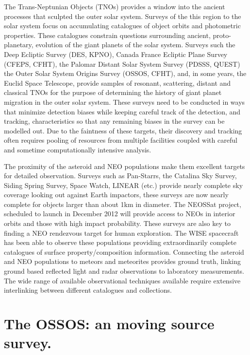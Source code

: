 \documentclass[11pt,twoside]{article}
\begin{document}
The Trans-Neptunian Objects (TNOs) provides a window into the ancient processes that sculpted the outer solar system.  
Surveys of the this region to the solar system focus on accumulating catalogues of object orbits and photometric properties.  
These catalogues constrain questions surrounding ancient, proto-planetary, evolution of the giant planets of the solar system.  
Surveys such the Deep Ecliptic Survey (DES, KPNO),  Canada France Ecliptic Plane Survey (CFEPS, CFHT), the Palomar Distant Solar System Survey (PDSSS, QUEST)  the  Outer Solar System Origins Survey (OSSOS, CFHT),  and, in some years, the Euclid Space Telescope, provide samples of resonant, scattering, distant and classical TNOs for the purpose of determining the history of giant planet migration in the outer solar system.
These surveys need to be conducted in ways that minimize detection biases while keeping careful track of the detection, and tracking, characteristics so that any remaining biases in the survey can be modelled out. 
Due to the faintness of these targets, their discovery and tracking often requires pooling of resources from multiple facilities coupled with careful and sometime computationally intensive analysis.

The proximity of the asteroid and NEO populations make them excellent targets for detailed observation.
Surveys such as Pan-Starrs, the Catalina Sky Survey, Siding Spring Survey, Space Watch, LINEAR (etc.) provide nearly complete sky coverage looking out against Earth impactors, these surveys are now nearly complete for objects larger than about 1km in diameter.  
The NEOSSat project, scheduled to launch in December 2012 will provide access to NEOs in interior orbits and those with high impact probability.  
These surveys are also key to finding a NEO rendezvous target for human exploration. 
The WISE spacecraft has been able to observe these populations providing extraordinarily complete catalogues of surface property/composition information. 
Connecting the asteroid and NEO populations to meteors and meteorites provides ground truth, linking ground based reflected light and radar observations to laboratory measurements.
The wide range of available observational techniques available require extensive interlinking between different catalogues and collections.


\section{The OSSOS: an moving source survey.}
\end{document}
